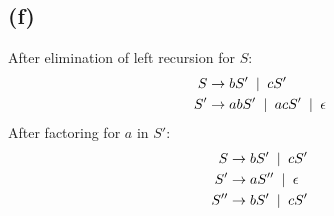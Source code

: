 \documentclass{article}
\begin{document}
	\subsection*{(f)}
	After elimination of left recursion for $S$:
		\begin{align*}
			S &\rightarrow bS' \hphantom{a} | \hphantom{a} cS'\\
			S' &\rightarrow abS' \hphantom{a} | \hphantom{a} acS' \hphantom{a} | \hphantom{a} \epsilon
		\end{align*}
	After factoring for $a$ in $S'$:
		\begin{align*}
			S &\rightarrow bS' \hphantom{a} | \hphantom{a} cS'\\
			S' &\rightarrow aS'' \hphantom{a} | \hphantom{a} \epsilon\\
			S'' &\rightarrow bS' \hphantom{a} | \hphantom{a} cS'
		\end{align*}
\end{document}
